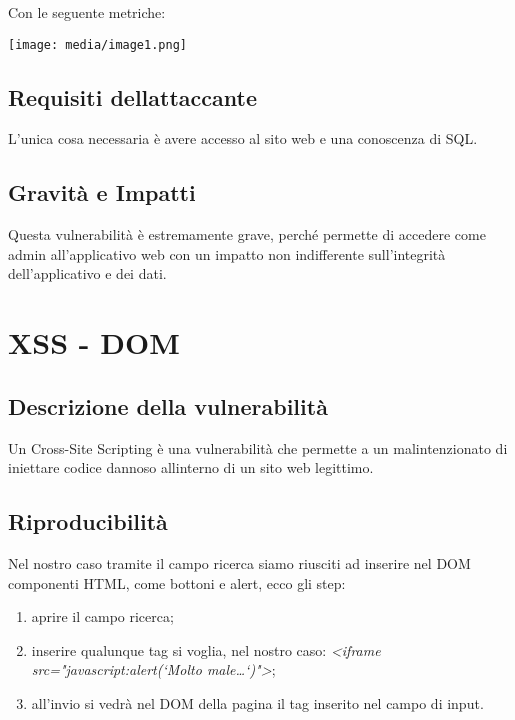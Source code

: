 Con le seguente metriche:

\texttt{[image: media/image1.png]}

\subsection{Requisiti
dell\textquotesingle attaccante}\label{requisiti-dellattaccante}

L'unica cosa necessaria è avere accesso al sito web e una conoscenza di
SQL.

\subsection{Gravità e Impatti}\label{gravituxe0-e-impatti}

Questa vulnerabilità è estremamente grave, perché permette di accedere
come admin all'applicativo web con un impatto non indifferente
sull'integrità dell'applicativo e dei dati.

\section{XSS - DOM}\label{xss---dom}

\subsection{Descrizione della
vulnerabilità}\label{descrizione-della-vulnerabilituxe0-1}

Un Cross-Site Scripting è una vulnerabilità che permette a un
malintenzionato di iniettare codice dannoso all\textquotesingle interno
di un sito web legittimo.

\subsection{Riproducibilità}\label{riproducibilituxe0-1}

Nel nostro caso tramite il campo ricerca siamo riusciti ad inserire nel
DOM componenti HTML, come bottoni e alert, ecco gli step:

\begin{enumerate}
\def\labelenumi{\arabic{enumi}.}
\item
  aprire il campo ricerca;
\item
  inserire qualunque tag si voglia, nel nostro caso:
  \emph{\textless iframe src="javascript:alert(`Molto
  male\ldots`)"\textgreater{}};
\item
  all'invio si vedrà nel DOM della pagina il tag inserito nel campo di
  input.
\end{enumerate}

